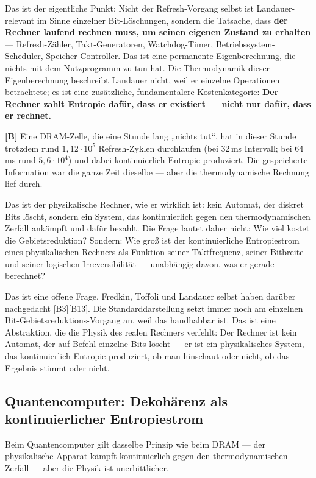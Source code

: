 Das ist der eigentliche Punkt: Nicht der Refresh-Vorgang selbst ist
Landauer-relevant im Sinne einzelner Bit-Löschungen, sondern die Tatsache, dass
\textbf{der Rechner laufend rechnen muss, um seinen eigenen Zustand zu erhalten}
--- Refresh-Zähler, Takt-Generatoren, Watchdog-Timer,
Betriebssystem-Scheduler, Speicher-Controller. Das ist eine permanente
Eigenberechnung, die nichts mit dem Nutzprogramm zu tun hat. Die Thermodynamik
dieser Eigenberechnung beschreibt Landauer nicht, weil er einzelne Operationen
betrachtete; es ist eine zusätzliche, fundamentalere Kostenkategorie:
\textbf{Der Rechner zahlt Entropie dafür, dass er existiert --- nicht nur dafür,
dass er rechnet.}

\textbf{[B]} Eine DRAM-Zelle, die eine Stunde lang „nichts tut“, hat in dieser Stunde
trotzdem rund $1{,}12\cdot10^{5}$ Refresh-Zyklen durchlaufen (bei 32\,ms
Intervall; bei 64\,ms rund $5{,}6\cdot10^{4}$) und dabei kontinuierlich Entropie
produziert. Die gespeicherte Information war die ganze Zeit dieselbe --- aber die
thermodynamische Rechnung lief durch.

Das ist der physikalische Rechner, wie er wirklich ist: kein Automat, der diskret
Bits löscht, sondern ein System, das kontinuierlich gegen den thermodynamischen
Zerfall ankämpft und dafür bezahlt. Die Frage lautet daher nicht: Wie viel kostet
die Gebietsreduktion? Sondern: Wie groß ist der kontinuierliche Entropiestrom
eines physikalischen Rechners als Funktion seiner Taktfrequenz, seiner Bitbreite
und seiner logischen Irreversibilität --- unabhängig davon, was er gerade
berechnet?

Das ist eine offene Frage. Fredkin, Toffoli und Landauer selbst haben darüber
nachgedacht [B3][B13]. Die Standarddarstellung setzt immer noch am einzelnen
Bit-Gebietsreduktions-Vorgang an, weil das handhabbar ist. Das ist eine
Abstraktion, die die Physik des realen Rechners verfehlt: Der Rechner ist kein
Automat, der auf Befehl einzelne Bits löscht --- er ist ein physikalisches System,
das kontinuierlich Entropie produziert, ob man hinschaut oder nicht, ob das
Ergebnis stimmt oder nicht.

\subsection{Quantencomputer: Dekohärenz als kontinuierlicher Entropiestrom}

Beim Quantencomputer gilt dasselbe Prinzip wie beim DRAM --- der physikalische
Apparat kämpft kontinuierlich gegen den thermodynamischen Zerfall --- aber die
Physik ist unerbittlicher.

